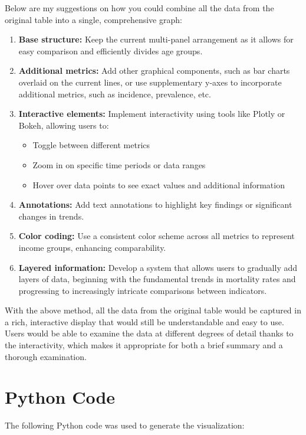 \documentclass[a4paper]{article}
\begin{document}
Below are my suggestions on how you could combine all the data from the original table into a single, comprehensive graph:

\begin{enumerate}
    \item \textbf{Base structure:} Keep the current multi-panel arrangement as it allows for easy comparison and efficiently divides age groups.

    \item \textbf{Additional metrics:} Add other graphical components, such as bar charts overlaid on the current lines, or use supplementary y-axes to incorporate additional metrics, such as incidence, prevalence, etc.

    \item \textbf{Interactive elements:} Implement interactivity using tools like Plotly or Bokeh, allowing users to:
    \begin{itemize}
        \item Toggle between different metrics
        \item Zoom in on specific time periods or data ranges
        \item Hover over data points to see exact values and additional information
    \end{itemize}

    \item \textbf{Annotations:} Add text annotations to highlight key findings or significant changes in trends.

    \item \textbf{Color coding:} Use a consistent color scheme across all metrics to represent income groups, enhancing comparability.

    \item \textbf{Layered information:} Develop a system that allows users to gradually add layers of data, beginning with the fundamental trends in mortality rates and progressing to increasingly intricate comparisons between indicators.
\end{enumerate}

With the above method, all the data from the original table would be captured in a rich, interactive display that would still be understandable and easy to use. Users would be able to examine the data at different degrees of detail thanks to the interactivity, which makes it appropriate for both a brief summary and a thorough examination.

\appendix
\section{Python Code}

The following Python code was used to generate the visualization:


\end{document}
